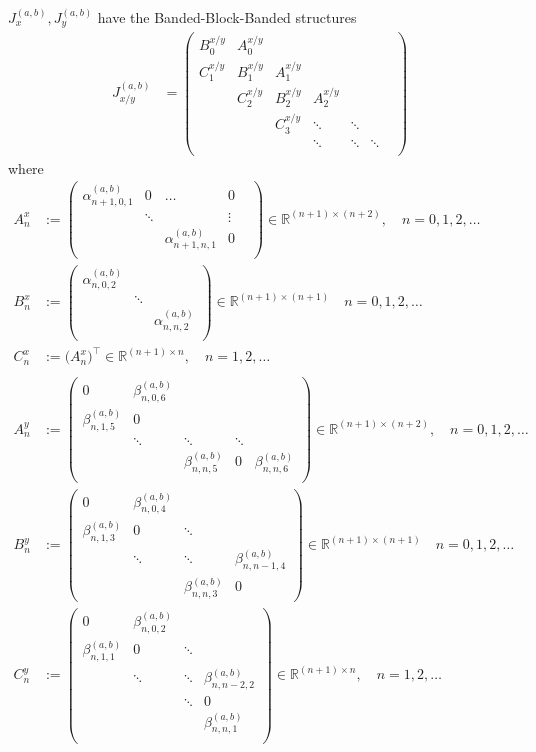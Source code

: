 \documentclass[11pt, oneside]{article}   	%
\newcommand{\R}{\mathbb{R}}
\newcommand{\alphaab}{\alpha^{(a,b)}}
\newcommand{\betaab}{\beta^{(a,b)}}
\begin{document}
$J_x^{(a,b)}, J_y^{(a,b)}$ have the Banded-Block-Banded structures
\begin{align}
J_{x/y}^{(a,b)} &= \begin{pmatrix}
		B^{x/y}_0 & A^{x/y}_0 & & & & \\
		C^{x/y}_1 & B^{x/y}_1 & A^{x/y}_1 & & & \\
		& C^{x/y}_2 & B^{x/y}_2 & A^{x/y}_2  & & & \\
		& & C^{x/y}_3 & \ddots & \ddots & \\
		& & & \ddots & \ddots & \ddots \\
	\end{pmatrix}
\end{align}
where
\begin{align}
A^x_n &:= \begin{pmatrix}
		\alphaab_{n+1,0,1} & 0 & \hdots & 0 \\
		& \ddots & & \vdots & \\
		& & \alphaab_{n+1,n,1} & 0 \\
	    \end{pmatrix} \in \R^{(n+1)\times(n+2)}, \quad n = 0,1,2,\dots \\
B^x_n &:= \begin{pmatrix}
		\alphaab_{n,0,2} & & \\
		& \ddots & \\
		& & \alphaab_{n,n,2} \\
	    \end{pmatrix} \in \R^{(n+1)\times(n+1)} \quad n = 0,1,2,\dots \\
C^x_n &:= \big( A^x_n \big)^\top \in \R^{(n+1)\times n},  \quad n = 1,2,\dots \\ 
\nonumber \\
A^y_n &:= \begin{pmatrix}
		0 & \betaab_{n,0,6} & & & \\
		\betaab_{n,1,5} & 0 & & & \\
		& \ddots & \ddots & \ddots & \\
		& & \betaab_{n,n,5}& 0 & \betaab_{n,n,6} \\
	    \end{pmatrix} \in \R^{(n+1)\times(n+2)}, \quad n = 0,1,2,\dots \\
B^y_n &:= \begin{pmatrix}
		0 & \betaab_{n,0,4} & & \\
		\betaab_{n,1,3} & 0 & \ddots & \\
		& \ddots & \ddots & \betaab_{n,n-1,4} \\
		& & \betaab_{n,n,3} & 0
	    \end{pmatrix} \in \R^{(n+1)\times(n+1)}  \quad n = 0,1,2,\dots \\
C^y_n &:= \begin{pmatrix}
		0 & \betaab_{n,0,2} & & \\
		\betaab_{n,1,1} & 0 & \ddots & \\
		& \ddots & \ddots & \betaab_{n,n-2,2} \\
		& & \ddots & 0 \\
		& & & \betaab_{n,n,1} \\
	    \end{pmatrix} \in \R^{(n+1)\times n}, \quad n = 1,2,\dots
\end{align}
\end{document}
